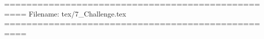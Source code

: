 





==================================================
Filename: tex/7_Challenge.tex
==================================================











